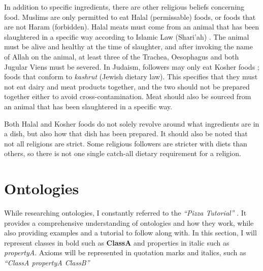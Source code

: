 In addition to specific ingredients, there are other religious beliefs concerning food. Muslims are only permitted to eat Halal (permissable) foods, or foods that are not Haram (forbidden). Halal meats must come from an animal that has been slaughtered in a specific way according to Islamic Law (Shari'ah) \cite{halal_monitoring_committee_2018}. The animal must be alive and healthy at the time of slaughter, and after invoking the name of Allah on the animal, at least three of the Trachea, Oesophagus and both Jugular Viens must be severed. In Judaism, followers may only eat Kosher foods \cite{kosher_2023} ; foods that conform to \textit{kashrut} (Jewish dietary law). This specifies that they must not eat dairy and meat products together, and the two should not be prepared together either to avoid cross-contamination. Meat should also be sourced from an animal that has been slaughtered in a specific way.

Both Halal and Kosher foods do not solely revolve around what ingredients are in a dish, but also how that dish has been prepared. It should also be noted that not all religions are strict. Some religious followers are stricter with diets than others, so there is not one single catch-all dietary requirement for a religion.


\section{Ontologies}

While researching ontologies, I constantly referred to the \textit{``Pizza Tutorial''} \cite{pizza_tutorial_site}. It provides a comprehensive understanding of ontologies and how they work, while also providing examples and a tutorial to follow along with. In this section, I will represent classes in bold such as \textbf{ClassA} and properties in italic such as \textit{propertyA}. Axioms will be represented in quotation marks and italics, such as \textit{``ClassA propertyA ClassB''}

